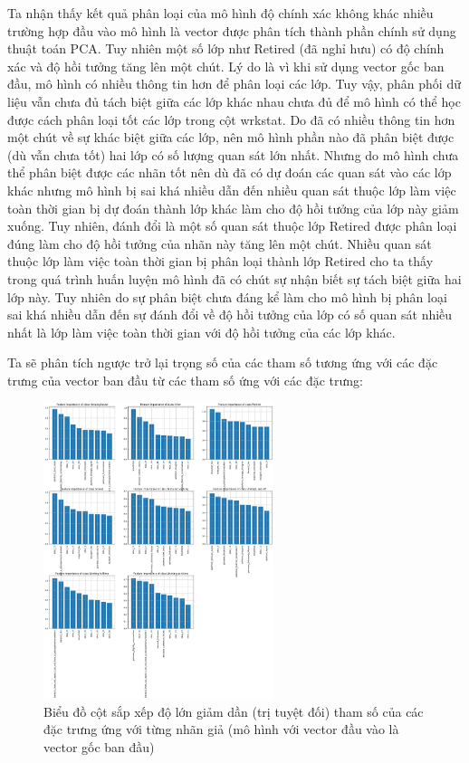 \begin{enumerate}[label=(\alph*)]
    Ta nhận thấy kết quả phân loại của mô hình độ chính xác không khác nhiều trường hợp đầu vào mô hình là vector được phân tích thành phần chính sử dụng thuật toán PCA.
    Tuy nhiên một số lớp như Retired (đã nghỉ hưu) có độ chính xác và độ hồi tưởng tăng lên một chút.
    Lý do là vì khi sử dụng vector gốc ban đầu, mô hình có nhiều thông tin hơn để phân loại các lớp.
    Tuy vậy, phân phối dữ liệu vẫn chưa đủ tách biệt giữa các lớp khác nhau chưa đủ để mô hình có thể học được cách phân loại tốt các lớp trong cột wrkstat.
    Do đã có nhiều thông tin hơn một chút về sự khác biệt giữa các lớp, nên mô hình phần nào đã phân biệt được (dù vẫn chưa tốt) hai lớp có số lượng quan sát lớn nhất.
    Nhưng do mô hình chưa thể phân biệt được các nhãn tốt nên dù đã có dự đoán các quan sát vào các lớp khác nhưng mô hình bị sai khá nhiều dẫn đến nhiều quan sát thuộc lớp làm việc toàn thời gian bị dự đoán thành lớp khác làm cho độ hồi tưởng của lớp này giảm xuống.
    Tuy nhiên, đánh đổi là một số quan sát thuộc lớp Retired được phân loại đúng làm cho độ hồi tưởng của nhãn này tăng lên một chút.
    Nhiều quan sát thuộc lớp làm việc toàn thời gian bị phân loại thành lớp Retired cho ta thấy trong quá trình huấn luyện mô hình đã có chút sự nhận biết sự tách biệt giữa hai lớp này.
    Tuy nhiên do sự phân biệt chưa đáng kể làm cho mô hình bị phân loại sai khá nhiều dẫn đến sự đánh đổi về độ hồi tưởng của lớp có số quan sát nhiều nhất là lớp làm việc toàn thời gian với độ hồi tưởng của các lớp khác.

    Ta sẽ phân tích ngược trở lại trọng số của các tham số tương ứng với các đặc trưng của vector ban đầu từ các tham số ứng với các đặc trưng:

    \begin{figure}[H]
        \centering
        \includegraphics[width=0.6\textwidth]{figures/Thanh/Models/Logistic/Non_null_models_Feature_Importance_Logistic_original_features.png}
        \caption{Biểu đồ cột sắp xếp độ lớn giảm dần (trị tuyệt đối) tham số của các đặc trưng ứng với từng nhãn giả (mô hình với vector đầu vào là vector gốc ban đầu)}
        \label{fig:Non_null_models_Feature_Importance_Logistic_original_features}
    \end{figure}


\end{enumerate}
